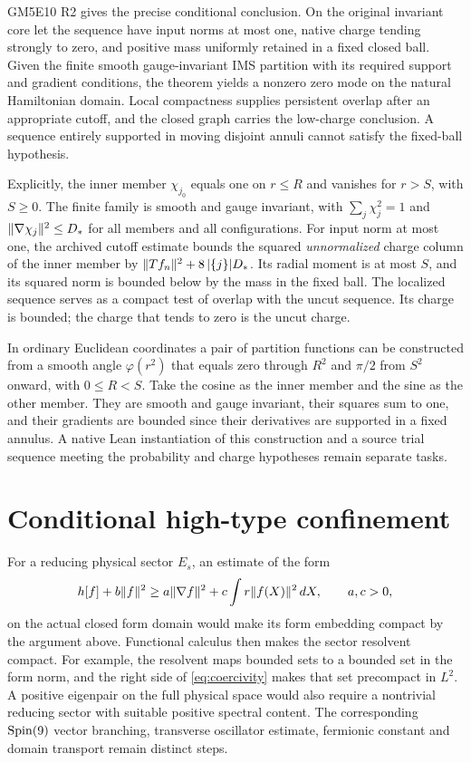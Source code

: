 GM5E10 R2 gives the precise conditional conclusion. On the original invariant core let the sequence have input norms at most one, native charge tending strongly to zero, and positive mass uniformly retained in a fixed closed ball. Given the finite smooth gauge-invariant IMS partition with its required support and gradient conditions, the theorem yields a nonzero zero mode on the natural Hamiltonian domain. Local compactness supplies persistent overlap after an appropriate cutoff, and the closed graph carries the low-charge conclusion. A sequence entirely supported in moving disjoint annuli cannot satisfy the fixed-ball hypothesis.

Explicitly, the inner member $\chi_{j_0}$ equals one on $r\le R$ and vanishes for $r>S$, with $S\ge0$. The finite family is smooth and gauge invariant, with $\sum_j\chi_j^2=1$ and $\lVert \nabla\chi_j\rVert^2\le D_*$ for all members and all configurations. For input norm at most one, the archived cutoff estimate bounds the squared \emph{unnormalized} charge column of the inner member by $\lVert Tf_n\rVert^2+8\,|\{j\}|D_*$. Its radial moment is at most $S$, and its squared norm is bounded below by the mass in the fixed ball. The localized sequence serves as a compact test of overlap with the uncut sequence. Its charge is bounded; the charge that tends to zero is the uncut charge.

In ordinary Euclidean coordinates a pair of partition functions can be constructed from a smooth angle $\varphi(r^2)$ that equals zero through $R^2$ and $\pi/2$ from $S^2$ onward, with $0\le R<S$. Take the cosine as the inner member and the sine as the other member. They are smooth and gauge invariant, their squares sum to one, and their gradients are bounded since their derivatives are supported in a fixed annulus. A native Lean instantiation of this construction and a source trial sequence meeting the probability and charge hypotheses remain separate tasks.

\section{Conditional high-type confinement}
For a reducing physical sector $E_s$, an estimate of the form
\begin{equation}
 h[f]+b\lVert f\rVert^2\ge
      a\lVert \nabla f\rVert^2+c\int r\lVert f(X)\rVert^2\,dX,\qquad a,c>0,
 \label{eq:coercivity}
\end{equation}
on the actual closed form domain would make its form embedding compact by the argument above. Functional calculus then makes the sector resolvent compact. For example, the resolvent maps bounded sets to a bounded set in the form norm, and the right side of \eqref{eq:coercivity} makes that set precompact in $L^2$. A positive eigenpair on the full physical space would also require a nontrivial reducing sector with suitable positive spectral content. The corresponding $\operatorname{Spin}(9)$ vector branching, transverse oscillator estimate, fermionic constant and domain transport remain distinct steps.

